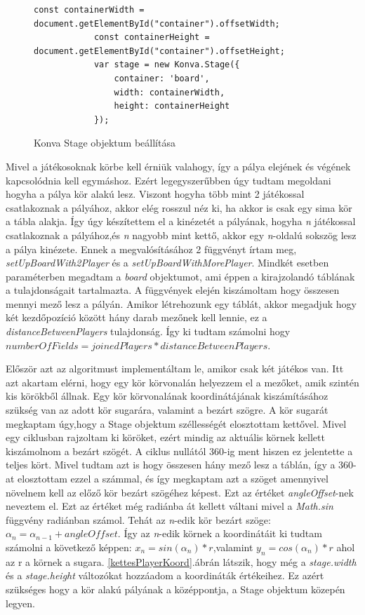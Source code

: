 \documentclass[a4paper,twoside]{article}
\begin{document}
\begin{figure}
	\caption{Konva Stage objektum beállítása}
	\begin{minipage}{\textwidth}
		\begin{lstlisting}[style=javascriptStyle]
			 const containerWidth = document.getElementById("container").offsetWidth;
			const containerHeight = document.getElementById("container").offsetHeight;
			var stage = new Konva.Stage({
				container: 'board',
				width: containerWidth,
				height: containerHeight
			});
		\end{lstlisting}
	\end{minipage}
	
	\label{konvaStage}
\end{figure}
\FloatBarrier

Mivel a játékosoknak körbe kell érniük valahogy, így a pálya elejének és végének kapcsolódnia kell egymáshoz. Ezért legegyszerűbben úgy tudtam megoldani hogyha a pálya kör alakú lesz. Viszont hogyha több mint 2 játékossal csatlakoznak a pályához, akkor elég rosszul néz ki, ha akkor is csak egy sima kör a tábla alakja. Így úgy készítettem el a kinézetét a pályának, hogyha \textit{n} játékossal csatlakoznak a pályához,és \textit{n} nagyobb mint kettő, akkor egy \textit{n}-oldalú sokszög lesz a pálya kinézete. Ennek a megvalósításához 2 függvényt írtam meg, \textit{setUpBoardWith2Player} és a \textit{setUpBoardWithMorePlayer}. Mindkét esetben paraméterben megadtam a \textit{board} objektumot, ami éppen a kirajzolandó táblának a tulajdonságait tartalmazta. A függvények elején kiszámoltam hogy összesen mennyi mező lesz a pályán. Amikor létrehozunk egy táblát, akkor megadjuk hogy két kezdőpozíció között hány darab mezőnek kell lennie, ez a \textit{distanceBetweenPlayers} tulajdonság. Így ki tudtam számolni hogy \(numberOfFields = joinedPlayers * distanceBetweenPlayers\).

Először azt az algoritmust implementáltam le, amikor csak két játékos van. Itt azt akartam elérni, hogy egy kör körvonalán helyezzem el a mezőket, amik szintén kis körökből állnak. Egy kör körvonalának koordinátájának kiszámításához szükség van az adott kör sugarára, valamint a bezárt szögre. A kör sugarát megkaptam úgy,hogy a Stage objektum széllességét elosztottam kettővel. Mivel egy ciklusban rajzoltam ki köröket, ezért mindig az aktuális körnek kellett kiszámolnom  a bezárt szögét. A ciklus nullától 360-ig ment hiszen ez jelentette a teljes kört. Mivel tudtam azt is hogy összesen hány mező lesz a táblán, így a 360-at elosztottam ezzel a számmal, és így megkaptam azt a szöget amennyivel növelnem kell az előző kör bezárt szögéhez képest. Ezt az értéket \textit{angleOffset}-nek neveztem el. Ezt az értéket még radiánba át kellett váltani mivel a \textit{Math.sin} függvény radiánban számol.  Tehát az \textit{n}-edik kör bezárt szöge: \(\alpha_{n} = \alpha_{n-1} + angleOffset\). Így az \textit{n}-edik körnek a koordinátáit ki tudtam számolni a következő képpen: 
\(x_{n} = sin(\alpha_{n})*r\),valamint \(y_{n} = cos(\alpha_{n})*r\) ahol az r a körnek a sugara. \ref{kettesPlayerKoord}.ábrán látszik, hogy még a \textit{stage.width} és a \textit{stage.height} változókat hozzáadom a koordináták értékeihez. Ez azért szükséges hogy a kör alakú pályának a középpontja, a Stage objektum közepén legyen. 
\end{document}
